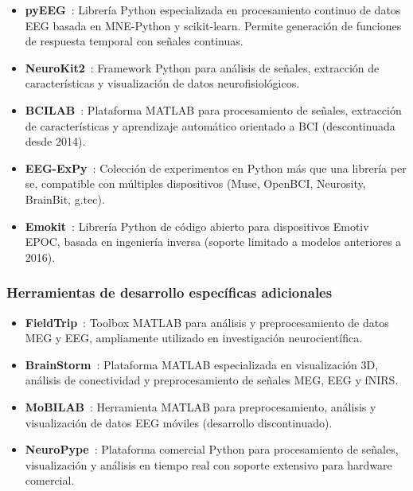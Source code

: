 \begin{itemize}
    \item \textbf{pyEEG}~\cite{pyeeg}: Librería Python especializada en procesamiento continuo de datos EEG basada en MNE-Python y scikit-learn. Permite generación de funciones de respuesta temporal con señales continuas.

    \item \textbf{NeuroKit2}~\cite{neurokit2}: Framework Python para análisis de señales, extracción de características y visualización de datos neurofisiológicos.

    \item \textbf{BCILAB}~\cite{bcilab}: Plataforma MATLAB para procesamiento de señales, extracción de características y aprendizaje automático orientado a BCI (descontinuada desde 2014).

    \item \textbf{EEG-ExPy}~\cite{eeg_expy}: Colección de experimentos en Python más que una librería per se, compatible con múltiples dispositivos (Muse, OpenBCI, Neurosity, BrainBit, g.tec).

    \item \textbf{Emokit}~\cite{emokit}: Librería Python de código abierto para dispositivos Emotiv EPOC, basada en ingeniería inversa (soporte limitado a modelos anteriores a 2016).
\end{itemize}

\subsubsection{Herramientas de desarrollo específicas adicionales}

\begin{itemize}
    \item \textbf{FieldTrip}~\cite{fieldtrip}: Toolbox MATLAB para análisis y preprocesamiento de datos MEG y EEG, ampliamente utilizado en investigación neurocientífica.

    \item \textbf{BrainStorm}~\cite{brainstorm}: Plataforma MATLAB especializada en visualización 3D, análisis de conectividad y preprocesamiento de señales MEG, EEG y fNIRS.

    \item \textbf{MoBILAB}~\cite{mobilab}: Herramienta MATLAB para preprocesamiento, análisis y visualización de datos EEG móviles (desarrollo discontinuado).

    \item \textbf{NeuroPype}~\cite{neuropype}: Plataforma comercial Python para procesamiento de señales, visualización y análisis en tiempo real con soporte extensivo para hardware comercial.
\end{itemize}

